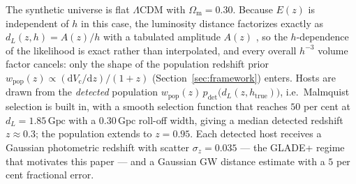 The synthetic universe is flat $\Lambda$CDM with $\Omega_{\mathrm{m}} = 0.30$. %
Because $E(z)$ is independent of $h$ in this case, the luminosity distance factorizes exactly as $d_L(z, h) = A(z)/h$ with a tabulated amplitude $A(z)$ \citep{Hogg:1999ad}, so the $h$-dependence of the likelihood is exact rather than interpolated, and every overall $h^{-3}$ volume factor cancels: only the shape of the population redshift prior $w_{\mathrm{pop}}(z) \propto (\mathrm{d}V_\mathrm{c}/\mathrm{d}z)/(1+z)$ (Section~\ref{sec:framework}) enters. Hosts are drawn from the \emph{detected} population $w_{\mathrm{pop}}(z)\, p_{\mathrm{det}}\!\big(d_L(z, h_{\mathrm{true}})\big)$, i.e.\ Malmquist selection is built in, with a smooth selection function that reaches $50$ per cent at $d_L = 1.85\,\mathrm{Gpc}$ with a $0.30\,\mathrm{Gpc}$ roll-off width, giving a median detected redshift $z \approx 0.3$; the population extends to $z = 0.95$. %
Each detected host receives a Gaussian photometric redshift with scatter $\sigma_z = 0.035$ --- the GLADE+ regime that motivates this paper \citep{Dalya:2021ewn} --- and a Gaussian GW distance estimate with a $5$ per cent fractional error. %

